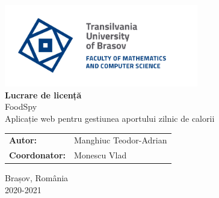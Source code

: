 \begin{titlepage}
	\begin{center}
		\includegraphics[width=240pt]{./Images/Logo/Logo-UT-MI-RGB-EN}
		\vspace*{48pt}\\
		\textbf{\LARGE Lucrare de licență}
		\vspace*{12pt}\\
		\LARGE FoodSpy\\
		\large Aplicație web pentru gestiunea aportului zilnic de calorii
		\vspace*{48pt}\\
		\begin{center}
			\large
			\begin{tabular}{ll}
				\textbf{Autor:}&Manghiuc Teodor-Adrian\\
				\textbf{Coordonator:}&Monescu Vlad\\
			\end{tabular}
		\end{center}
		
		\vfill
		\large Brașov, România\\2020-2021
	\end{center}
\end{titlepage}